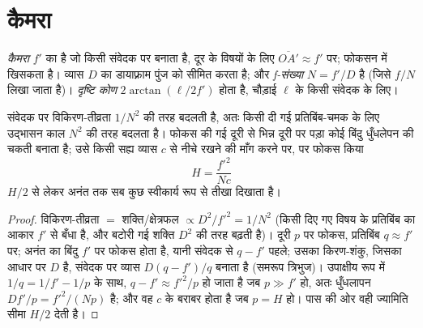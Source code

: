 \section{कैमरा}

\begin{definition}[कैमरा; f-संख्या]\label{def:b1:optical-instruments:camera}
\emph{कैमरा}  $f'$ का  है जो किसी संवेदक पर  बनाता है, दूर के विषयों के लिए $\overline{OA'} \approx f'$ पर;
फोकसन में  खिसकता है। व्यास $D$ का डायाफ़्राम पुंज को सीमित करता है;
और \emph{f-संख्या} $N = f'/D$ है (जिसे $f/N$ लिखा जाता है)। \emph{दृष्टि कोण}
$2\arctan(\ell/2f')$ होता है, चौड़ाई $\ell$ के किसी संवेदक के लिए।
\end{definition}

\begin{proposition}[उद्भासन और क्षेत्र-गहराई]\label{prop:b1:optical-instruments:dof}
संवेदक पर विकिरण-तीव्रता $1/N^2$ की तरह बदलती है, अतः किसी दी गई प्रतिबिंब-चमक
के लिए उद्भासन काल $N^2$ की तरह बदलता है। फोकस की गई दूरी से भिन्न दूरी पर
पड़ा कोई बिंदु धुँधलेपन की चकती बनाता है; उसे किसी सह्य व्यास $c$ से नीचे रखने
की माँग करने पर, \emph{}
पर फोकस किया 
\[
H = \frac{f'^2}{N c}
\]
$H/2$ से लेकर अनंत तक सब कुछ स्वीकार्य रूप से तीखा दिखाता है।
\end{proposition}

\begin{proof}
विकिरण-तीव्रता $=$ शक्ति/क्षेत्रफल $\propto D^2/f'^2 = 1/N^2$ (किसी दिए गए
विषय के प्रतिबिंब का आकार $f'$ से बँधा है, और बटोरी गई शक्ति
$D^2$ की तरह बढ़ती है)। दूरी $p$ पर फोकस, प्रतिबिंब $q \approx f'$ पर;
अनंत का बिंदु $f'$ पर फोकस होता है, यानी संवेदक से $q - f'$ पहले;
उसका किरण-शंकु, जिसका आधार  पर $D$ है, संवेदक पर व्यास $D(q - f')/q$
बनाता है (समरूप त्रिभुज)। उपाक्षीय रूप में $1/q = 1/f' - 1/p$ के साथ,
$q - f' \approx f'^2/p$ हो जाता है जब $p \gg f'$ हो, अतः धुँधलापन
$Df'/p = f'^2/(Np)$ है; और वह $c$ के बराबर होता है जब $p = H$ हो। पास की ओर
वही ज्यामिति सीमा $H/2$ देती है।
\end{proof}

